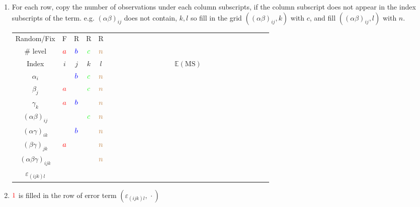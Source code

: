 \begin{enumerate}[topsep=2pt,itemsep=2pt]
    \item For each row, copy the number of observations under each column subscripts, if the column subscript does not appear in the index subscripts of the term. e.g. $ (\alpha \beta )_{ij} $ does not contain, $ k,l $ so fill in the grid $ ((\alpha \beta )_{ij},k) $ with $ c $, and fill $ ((\alpha \beta )_{ij},l) $ with $ n $.
    
    \begin{table}[H]
        \centering
        \renewcommand\arraystretch{1}
        \begin{tabular}{cccccc}
            \hline
            \hline
            Random/Fix                      &F      &R      &R      &R      &$ \qquad\qquad\qquad\qquad\qquad\qquad\qquad\qquad\qquad\qquad\qquad$\\
            \# level                        &$ \color{red}a $  &$ \color{blue}b $  &$ \color{green}c $  &$ \color{brown}n $  &\\
            Index                           &$ i $  &$ j $  &$ k $  &$ l $  &$ \mathbb{E}\left( \mathrm{MS}  \right)  $\\
            \hline
            $ \alpha _i $                   &       &$ \color{blue}b $  &$ \color{green}c $  &$ \color{brown}n $  &\\
            $ \beta _j $                    &$ \color{red}a $  &       &$ \color{green}c $  &$ \color{brown}n $  &\\
            $ \gamma _k $                   &$ \color{red}a $  &$ \color{blue}b $  &       &$ \color{brown}n $  &\\
            $ (\alpha \beta )_{ij} $        &       &       &$ \color{green}c $  &$ \color{brown}n $  &\\
            $ (\alpha \gamma )_{ik} $       &       &$ \color{blue}b $  &       &$ \color{brown}n $  &\\
            $ (\beta \gamma )_{jk} $        &$ \color{red}a $  &       &       &$ \color{brown}n $  &\\
            $ (\alpha \beta \gamma )_{ijk} $&       &       &       &$ \color{brown}n $  &\\
            $ \varepsilon _{(ijk)l} $       &       &       &       &       &\\
            \hline
            \hline
        \end{tabular}
        \label{}
    \end{table}
    \item $ \color{red}1 $ is filled in the row of error term $ (\varepsilon _{(ijk)l},\,\cdot) $
    

\end{enumerate}
